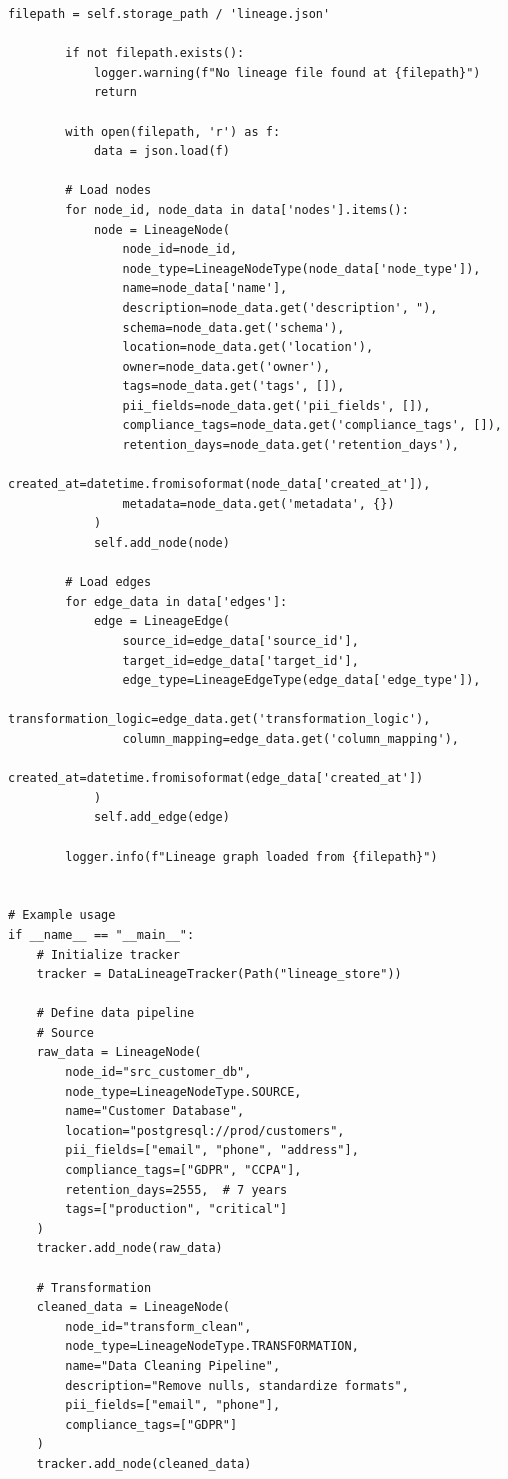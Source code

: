 \begin{lstlisting}[style=python, caption={Automated data lineage tracking system}]
        filepath = self.storage_path / 'lineage.json'

        if not filepath.exists():
            logger.warning(f"No lineage file found at {filepath}")
            return

        with open(filepath, 'r') as f:
            data = json.load(f)

        # Load nodes
        for node_id, node_data in data['nodes'].items():
            node = LineageNode(
                node_id=node_id,
                node_type=LineageNodeType(node_data['node_type']),
                name=node_data['name'],
                description=node_data.get('description', "),
                schema=node_data.get('schema'),
                location=node_data.get('location'),
                owner=node_data.get('owner'),
                tags=node_data.get('tags', []),
                pii_fields=node_data.get('pii_fields', []),
                compliance_tags=node_data.get('compliance_tags', []),
                retention_days=node_data.get('retention_days'),
                created_at=datetime.fromisoformat(node_data['created_at']),
                metadata=node_data.get('metadata', {})
            )
            self.add_node(node)

        # Load edges
        for edge_data in data['edges']:
            edge = LineageEdge(
                source_id=edge_data['source_id'],
                target_id=edge_data['target_id'],
                edge_type=LineageEdgeType(edge_data['edge_type']),
                transformation_logic=edge_data.get('transformation_logic'),
                column_mapping=edge_data.get('column_mapping'),
                created_at=datetime.fromisoformat(edge_data['created_at'])
            )
            self.add_edge(edge)

        logger.info(f"Lineage graph loaded from {filepath}")


# Example usage
if __name__ == "__main__":
    # Initialize tracker
    tracker = DataLineageTracker(Path("lineage_store"))

    # Define data pipeline
    # Source
    raw_data = LineageNode(
        node_id="src_customer_db",
        node_type=LineageNodeType.SOURCE,
        name="Customer Database",
        location="postgresql://prod/customers",
        pii_fields=["email", "phone", "address"],
        compliance_tags=["GDPR", "CCPA"],
        retention_days=2555,  # 7 years
        tags=["production", "critical"]
    )
    tracker.add_node(raw_data)

    # Transformation
    cleaned_data = LineageNode(
        node_id="transform_clean",
        node_type=LineageNodeType.TRANSFORMATION,
        name="Data Cleaning Pipeline",
        description="Remove nulls, standardize formats",
        pii_fields=["email", "phone"],
        compliance_tags=["GDPR"]
    )
    tracker.add_node(cleaned_data)


\end{lstlisting}
